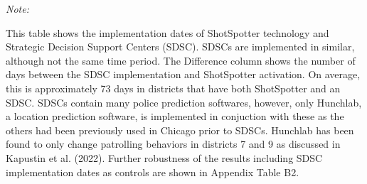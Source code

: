 \begin{table}[H]
\begin{threeparttable}
\begin{tablenotes}
\item \textit{Note: } 
\item This table shows                      the implementation dates of ShotSpotter technology and                      Strategic Decision Support Centers (SDSC). SDSCs are implemented                      in similar, although not the same time period.                      The Difference column shows the number of days between                      the SDSC implementation and ShotSpotter activation. On                      average, this is approximately                      73 days in districts that have both ShotSpotter and an SDSC. SDSCs contain many                       police prediction softwares, however,                      only Hunchlab, a location prediction software,                      is implemented in conjuction with these as the others                      had been previously used in Chicago prior to SDSCs.                       Hunchlab has been                      found to only change patrolling behaviors in                      districts 7 and 9 as discussed in Kapustin et al. (2022). Further                      robustness of the results including SDSC implementation dates                      as controls are shown in Appendix Table B2.
\end{tablenotes}
\end{threeparttable}
\end{table}

